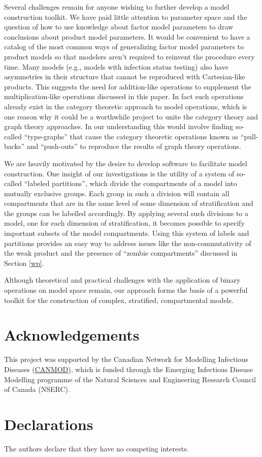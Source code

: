 \documentclass[pdflatex,sn-basic]{sn-jnl}%
\theoremstyle{definition}
\begin{document}
Several challenges remain for anyone wishing to further develop a model construction toolkit. We have paid little attention to parameter space and the question of how to use knowledge about factor model parameters to draw conclusions about product model parameters. It would be convenient to have a catalog of the most common ways of generalizing factor model parameters to product models so that modelers aren't required to reinvent the procedure every time. Many models (e.g., models with infection status testing) also have asymmetries in their structure that cannot be reproduced with Cartesian-like products. This suggests the need for addition-like operations to supplement the multiplication-like operations discussed in this paper. In fact such operations already exist in the category theoretic approach to model operations, which is one reason why it could be a worthwhile project to unite the category theory and graph theory approaches. In our understanding this would involve finding so-called ``type-graphs'' that cause the category theoretic operations known as ``pull-backs'' and ``push-outs'' to  reproduce the results of graph theory operations.
\citep{fong2018seven, Libkind2022an, libkind2021operadic, baez2022compositional, baez2017compositional}

We are heavily motivated by the desire to develop software to facilitate model construction. One insight of our investigations is the utility of a system of so-called ``labeled partitions'', which divide the compartments of a model into mutually exclusive groups. Each group in such a division will contain all compartments that are in the same level of some dimension of stratification and the groups can be labelled accordingly. By applying several such divisions to a model, one for each dimension of stratification, it becomes possible to specify important subsets of the model compartments. Using this system of labels and partitions provides an easy way to address issues like the non-commutativity of the weak product and the presence of ``zombie compartments'' discussed in Section \ref{wp}.

Although theoretical and practical challenges with the application of binary operations on model space remain, our approach forms the basis of a powerful toolkit for the construction of complex, stratified, compartmental models.

\section{Acknowledgements}

This project was supported by the Canadian Network for Modelling Infectious Diseases (\href{https://canmod.net/}{CANMOD}), which is funded through the Emerging Infectious Disease Modelling programme of the Natural Sciences and Engineering Research Council of Canada (NSERC).

\section{Declarations}

The authors declare that they have no competing interests.


\end{document}

